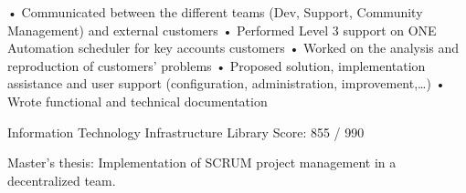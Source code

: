 \documentclass[
	a4paper,
]{fortysecondscv}
\begin{document}
\begin{cvtable}[3]
{			• Communicated between the different teams (Dev, Support, Community 
			Management) and external customers\newline
        }
        {
            • Performed Level 3 support on ONE Automation scheduler for key 
			accounts customers\newline
            • Worked on the analysis and reproduction of customers' 
			problems\newline
            • Proposed solution, implementation assistance and user support 
			(configuration, administration, improvement,\dots)\newline
            • Wrote functional and technical documentation\newline
        }
\end{cvtable}


\begin{cvtable}[1.5]
		{Information Technology Infrastructure Library}
		{Score: 855 / 990\\}
\end{cvtable}


\begin{cvtable}[1.5]
		{Master's thesis: Implementation of SCRUM project management in a 
		decentralized team.}
\end{cvtable}
\end{document}
